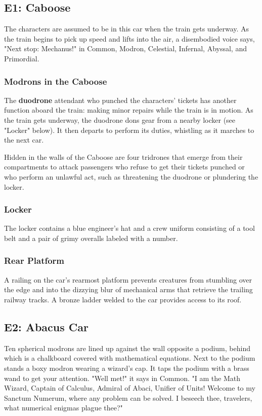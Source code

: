 \documentclass[10pt,a4paper,twoside,bg=print,twocolumn,openany,nodeprecatedcode]{dndbook}
\begin{document}
\subsection{E1: Caboose}
The characters are assumed to be in this car when the train gets underway. As the train begins to pick up speed and lifts into the air, a disembodied voice says, "Next stop: Mechanus!" in Common, Modron, Celestial, Infernal, Abyssal, and Primordial.

\subsubsection{Modrons in the Caboose}
The \textbf{duodrone} attendant who punched the characters' tickets has another function aboard the train: making minor repairs while the train is in motion. As the train gets underway, the duodrone dons gear from a nearby locker (see "Locker" below). It then departs to perform its duties, whistling as it marches to the next car.

Hidden in the walls of the Caboose are four tridrones that emerge from their compartments to attack passengers who refuse to get their tickets punched or who perform an unlawful act, such as threatening the duodrone or plundering the locker.

\subsubsection{Locker}
The locker contains a blue engineer's hat and a crew uniform consisting of a tool belt and a pair of grimy overalls labeled with a number.

\subsubsection{Rear Platform}
A railing on the car's rearmost platform prevents creatures from stumbling over the edge and into the dizzying blur of mechanical arms that retrieve the trailing railway tracks. A bronze ladder welded to the car provides access to its roof.

\subsection{E2: Abacus Car}
\begin{DndReadAloud}{}
Ten spherical modrons are lined up against the wall opposite a podium, behind which is a chalkboard covered with mathematical equations. Next to the podium stands a boxy modron wearing a wizard's cap. It taps the podium with a brass wand to get your attention. "Well met!" it says in Common. "I am the Math Wizard, Captain of Calculus, Admiral of Abaci, Unifier of Units! Welcome to my Sanctum Numerum, where any problem can be solved. I beseech thee, travelers, what numerical enigmas plague thee?"

\end{DndReadAloud}
\end{document}
